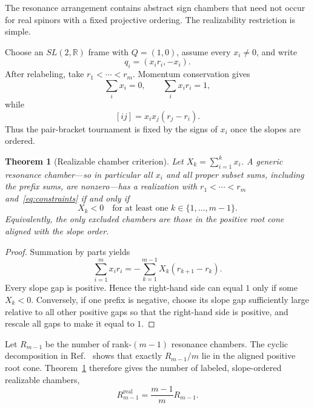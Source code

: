 \documentclass[11pt]{article}
\newtheorem{theorem}{Theorem}[section]
\theoremstyle{definition}
\theoremstyle{remark}
\newcommand{\R}{\mathbb{R}}
\begin{document}
The resonance arrangement contains abstract sign chambers that need not occur
for real spinors with a fixed projective ordering.  The realizability
restriction is simple.

Choose an $SL(2,\R)$ frame with $Q=(1,0)$, assume every $x_i\neq0$, and write
\begin{equation}\label{eq:slopeparam}
  q_i=(x_i r_i,-x_i).
\end{equation}
After relabeling, take $r_1<\cdots<r_m$.  Momentum conservation gives
\begin{equation}\label{eq:constraints}
  \sum_i x_i=0,
  \qquad
  \sum_i x_i r_i=1,
\end{equation}
while
\begin{equation}\label{eq:pairfactor}
  [ij]=x_i x_j(r_j-r_i).
\end{equation}
Thus the pair-bracket tournament is fixed by the signs of $x_i$ once the
slopes are ordered.

\begin{theorem}[Realizable chamber criterion]\label{thm:realizable}
Let $X_k=\sum_{i=1}^k x_i$.  A generic resonance chamber---so in particular
all $x_i$ and all proper subset sums, including the prefix sums, are
nonzero---has a realization
with $r_1<\cdots<r_m$ and~\eqref{eq:constraints} if and only if
\begin{equation}
  X_k<0\quad\text{for at least one }k\in\{1,\ldots,m-1\}.
\end{equation}
Equivalently, the only excluded chambers are those in the positive root cone
aligned with the slope order.
\end{theorem}

\begin{proof}
Summation by parts yields
\begin{equation}\label{eq:summationbyparts}
  \sum_{i=1}^m x_i r_i
  =-\sum_{k=1}^{m-1}X_k(r_{k+1}-r_k).
\end{equation}
Every slope gap is positive.  Hence the right-hand side can equal $1$ only if
some $X_k<0$.  Conversely, if one prefix is negative, choose its slope gap
sufficiently large relative to all other positive gaps so that the right-hand
side is positive, and rescale all gaps to make it equal to $1$.
\end{proof}

Let $R_{m-1}$ be the number of rank-$(m-1)$ resonance chambers.  The cyclic
decomposition in Ref.~\cite{RootCones} shows that exactly $R_{m-1}/m$ lie in
the aligned positive root cone.  Theorem~\ref{thm:realizable} therefore gives
the number of labeled, slope-ordered realizable chambers,
\begin{equation}\label{eq:realizablecount}
  R^{\mathrm{real}}_{m-1}=\frac{m-1}{m}R_{m-1}.
\end{equation}
\end{document}
